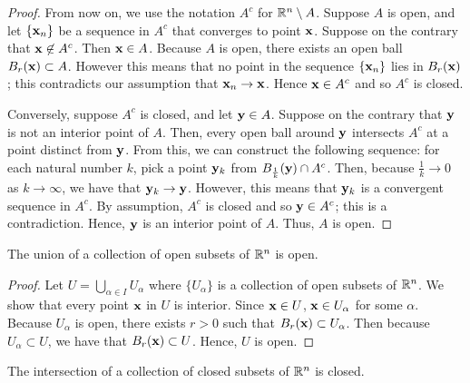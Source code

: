 \documentclass[letterpaper, twoside, 12pt]{book}
\begin{document}
\begin{proof}
    From now on, we use the notation \(A^c\) for \(\mathbb R^n \setminus A\).
    Suppose \(A\) is open, and let \(\{\mathbf x_n\}\) be a sequence in
    \(A^c\) that converges to point \(\mathbf x\). Suppose on the contrary
    that \(\mathbf x \not\in A^c\). Then \(\mathbf x \in A\). Because \(A\)
    is open, there exists an open ball \(B_r(\mathbf x) \subset A\). However
    this means that no point in the sequence \(\{\mathbf x_n\}\) lies in
    \(B_r(\mathbf x)\); this contradicts our assumption that 
    \(\mathbf x_n \to \mathbf x\). Hence \(\mathbf x \in A^c\) and so \(A^c\)
    is closed.

    Conversely, suppose \(A^c\) is closed, and let \(\mathbf y \in A\).
    Suppose on the contrary that \(\mathbf y\) is not an interior point 
    of \(A\). Then, every open ball around \(\mathbf y\) intersects
    \(A^c\) at a point distinct from \(\mathbf y\). From this, we can 
    construct the following sequence: for each natural number \(k\),
    pick a point \(\mathbf y_k\) from \(B_{\frac{1}{k}}(\mathbf y) \cap A^c\).
    Then, because \(\frac{1}{k} \to 0\) as \(k \to \infty\), we
    have that \(\mathbf y_k \to \mathbf y\). However, this means that
    \(\mathbf y_k\) is a convergent sequence in \(A^c\). By assumption,
    \(A^c\) is closed and so \(\mathbf y \in A^c\); this is a contradiction.
    Hence, \(\mathbf y\) is an interior point of \(A\). Thus, \(A\)
    is open.

\end{proof}

\begin{proposition}[10.17.i]
  The union of a collection of open subsets of \(\mathbb R^n\) is open.
\end{proposition}

\begin{proof}
    Let \(U = \bigcup_{\alpha \in I} U_\alpha\) where \(\{U_\alpha\}\) is a collection
    of open subsets of \(\mathbb R^n\). We show that every point \(\mathbf x\)
    in \(U\) is interior. Since \(\mathbf x \in U\), \(\mathbf x \in U_\alpha\)
    for some \(\alpha\). Because \(U_\alpha\) is open, there exists \(r > 0\)
    such that \(B_r(\mathbf x) \subset U_\alpha\). Then because
    \(U_\alpha \subset U\), we have that \(B_r(\mathbf x) \subset U\).
    Hence, \(U\) is open.
\end{proof}

\begin{proposition}[10.17.ii]
  The intersection of a collection of closed subsets of \(\mathbb R^n\) is closed.
\end{proposition}
\end{document}
